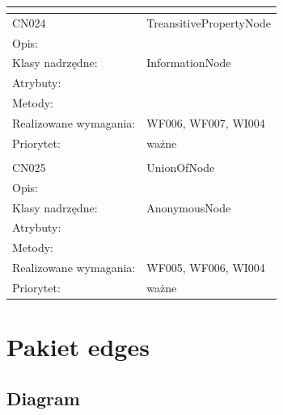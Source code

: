 \documentclass[a4paper,10pt]{article}
\begin{document}
\begin{center}
\begin{longtable}{|m{3cm}|m{9cm}|}
\multicolumn{2}{c}{} \\
 \hline

CN024 & TreansitivePropertyNode \\ \hline
Opis: &     \\ \hline
Klasy nadrzędne: & InformationNode     \\ \hline
Atrybuty: & %
 \\ \hline
Metody: & %
  \\ \hline
Realizowane wymagania: & WF006, WF007, WI004 \\ \hline
Priorytet: & ważne  \\ \hline

\multicolumn{2}{c}{} \\
 \hline

CN025 & UnionOfNode \\ \hline
Opis: &     \\ \hline
Klasy nadrzędne: & AnonymousNode     \\ \hline
Atrybuty: & %
 \\ \hline
Metody: & %
  \\ \hline
Realizowane wymagania: & WF005, WF006, WI004 \\ \hline
Priorytet: & ważne  \\ \hline



\end{longtable}

\end{center}

\section{Pakiet edges}

\subsection{Diagram}
\end{document}
